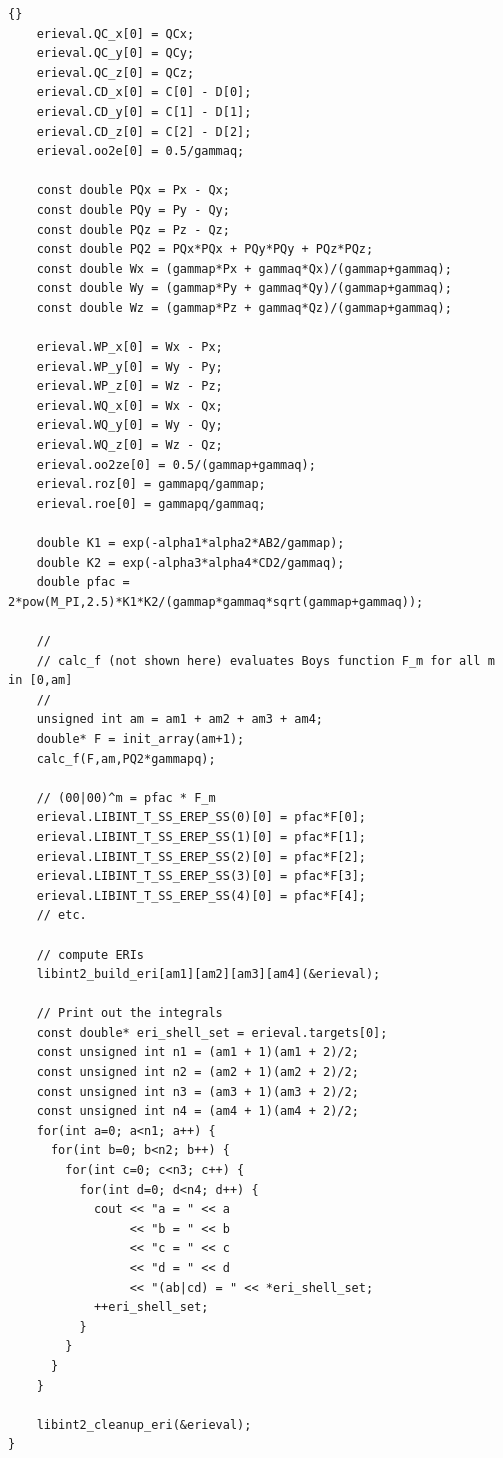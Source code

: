 \documentclass[10pt]{article}
\begin{document}
\begin{lstlisting}[label=lst:usecpp,caption=Using \LIBINT\ from C++.]{}
    erieval.QC_x[0] = QCx;
    erieval.QC_y[0] = QCy;
    erieval.QC_z[0] = QCz;
    erieval.CD_x[0] = C[0] - D[0];
    erieval.CD_y[0] = C[1] - D[1];
    erieval.CD_z[0] = C[2] - D[2];
    erieval.oo2e[0] = 0.5/gammaq;
    
    const double PQx = Px - Qx;
    const double PQy = Py - Qy;
    const double PQz = Pz - Qz;
    const double PQ2 = PQx*PQx + PQy*PQy + PQz*PQz;
    const double Wx = (gammap*Px + gammaq*Qx)/(gammap+gammaq);
    const double Wy = (gammap*Py + gammaq*Qy)/(gammap+gammaq);
    const double Wz = (gammap*Pz + gammaq*Qz)/(gammap+gammaq);
    
    erieval.WP_x[0] = Wx - Px;
    erieval.WP_y[0] = Wy - Py;
    erieval.WP_z[0] = Wz - Pz;
    erieval.WQ_x[0] = Wx - Qx;
    erieval.WQ_y[0] = Wy - Qy;
    erieval.WQ_z[0] = Wz - Qz;
    erieval.oo2ze[0] = 0.5/(gammap+gammaq);
    erieval.roz[0] = gammapq/gammap;
    erieval.roe[0] = gammapq/gammaq;
    
    double K1 = exp(-alpha1*alpha2*AB2/gammap);
    double K2 = exp(-alpha3*alpha4*CD2/gammaq);
    double pfac = 2*pow(M_PI,2.5)*K1*K2/(gammap*gammaq*sqrt(gammap+gammaq));

    //
    // calc_f (not shown here) evaluates Boys function F_m for all m in [0,am]
    //
    unsigned int am = am1 + am2 + am3 + am4;
    double* F = init_array(am+1);
    calc_f(F,am,PQ2*gammapq);

    // (00|00)^m = pfac * F_m
    erieval.LIBINT_T_SS_EREP_SS(0)[0] = pfac*F[0];
    erieval.LIBINT_T_SS_EREP_SS(1)[0] = pfac*F[1];
    erieval.LIBINT_T_SS_EREP_SS(2)[0] = pfac*F[2];
    erieval.LIBINT_T_SS_EREP_SS(3)[0] = pfac*F[3];
    erieval.LIBINT_T_SS_EREP_SS(4)[0] = pfac*F[4];
    // etc.

    // compute ERIs
    libint2_build_eri[am1][am2][am3][am4](&erieval);

    // Print out the integrals
    const double* eri_shell_set = erieval.targets[0];
    const unsigned int n1 = (am1 + 1)(am1 + 2)/2;
    const unsigned int n2 = (am2 + 1)(am2 + 2)/2;
    const unsigned int n3 = (am3 + 1)(am3 + 2)/2;
    const unsigned int n4 = (am4 + 1)(am4 + 2)/2;
    for(int a=0; a<n1; a++) {
      for(int b=0; b<n2; b++) {
        for(int c=0; c<n3; c++) {
          for(int d=0; d<n4; d++) {
            cout << "a = " << a
                 << "b = " << b
                 << "c = " << c
                 << "d = " << d
                 << "(ab|cd) = " << *eri_shell_set;
            ++eri_shell_set;
          }
        }
      }
    }

    libint2_cleanup_eri(&erieval);
}
\end{lstlisting}
\end{document}
